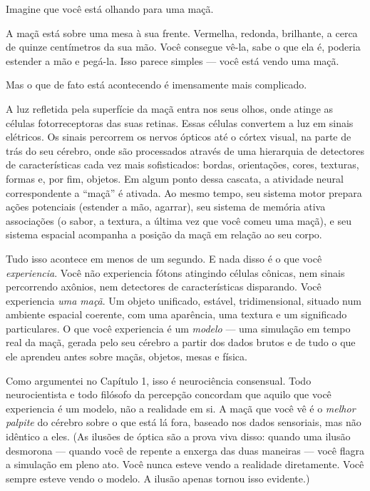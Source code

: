 \documentclass[11pt, twoside, openright]{book}
\begin{document}
Imagine que você está olhando para uma maçã.

A maçã está sobre uma mesa à sua frente. Vermelha, redonda, brilhante, a cerca de quinze centímetros da sua mão. Você consegue vê-la, sabe o que ela é, poderia estender a mão e pegá-la. Isso parece simples --- você está vendo uma maçã.

Mas o que de fato está acontecendo é imensamente mais complicado.

A luz refletida pela superfície da maçã entra nos seus olhos, onde atinge as células fotorreceptoras das suas retinas. Essas células convertem a luz em sinais elétricos. Os sinais percorrem os nervos ópticos até o córtex visual, na parte de trás do seu cérebro, onde são processados através de uma hierarquia de detectores de características cada vez mais sofisticados: bordas, orientações, cores, texturas, formas e, por fim, objetos. Em algum ponto dessa cascata, a atividade neural correspondente a ``maçã'' é ativada. Ao mesmo tempo, seu sistema motor prepara ações potenciais (estender a mão, agarrar), seu sistema de memória ativa associações (o sabor, a textura, a última vez que você comeu uma maçã), e seu sistema espacial acompanha a posição da maçã em relação ao seu corpo.

Tudo isso acontece em menos de um segundo. E nada disso é o que você \textit{experiencia}. Você não experiencia fótons atingindo células cônicas, nem sinais percorrendo axônios, nem detectores de características disparando. Você experiencia \textit{uma maçã}. Um objeto unificado, estável, tridimensional, situado num ambiente espacial coerente, com uma aparência, uma textura e um significado particulares. O que você experiencia é um \textit{modelo} --- uma simulação em tempo real da maçã, gerada pelo seu cérebro a partir dos dados brutos e de tudo o que ele aprendeu antes sobre maçãs, objetos, mesas e física.

Como argumentei no Capítulo 1, isso é neurociência consensual. Todo neurocientista e todo filósofo da percepção concordam que aquilo que você experiencia é um modelo, não a realidade em si. A maçã que você vê é o \textit{melhor palpite} do cérebro sobre o que está lá fora, baseado nos dados sensoriais, mas não idêntico a eles. (As ilusões de óptica são a prova viva disso: quando uma ilusão desmorona --- quando você de repente a enxerga das duas maneiras --- você flagra a simulação em pleno ato. Você nunca esteve vendo a realidade diretamente. Você sempre esteve vendo o modelo. A ilusão apenas tornou isso evidente.)
\end{document}
